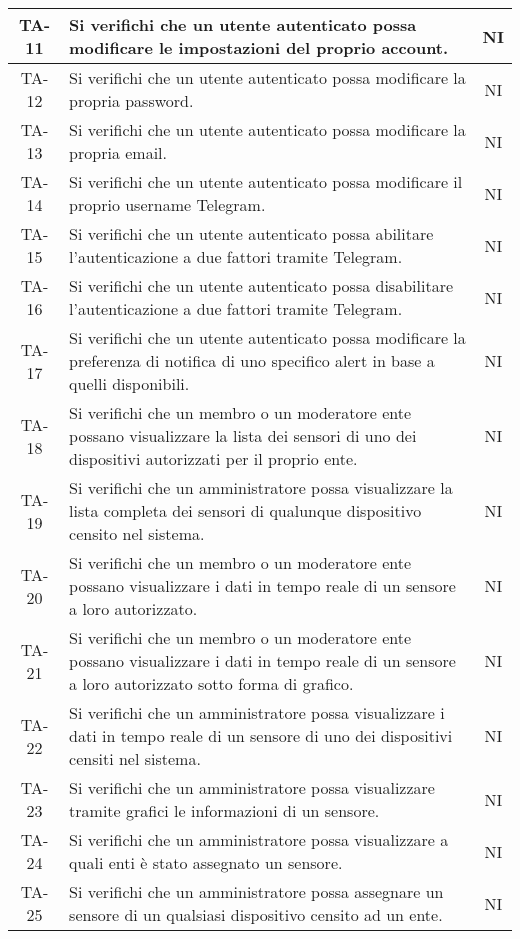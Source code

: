 \begin{center}
\begin{longtable}{|c|p{10cm}|c|}
			 \hline
			 TA-11 & Si verifichi che un utente autenticato possa modificare le impostazioni del proprio account. & NI \\
			 \hline
			 TA-12 & Si verifichi che un utente autenticato possa modificare la propria password. & NI \\
			 \hline
			 TA-13 & Si verifichi che un utente autenticato possa modificare la propria email. & NI \\
			 \hline
			 TA-14 & Si verifichi che un utente autenticato possa modificare il proprio username Telegram. & NI \\
			 \hline
			 TA-15 & Si verifichi che un utente autenticato possa abilitare l'autenticazione a due fattori tramite Telegram. & NI \\
			 \hline
			 TA-16 & Si verifichi che un utente autenticato possa disabilitare l'autenticazione a due fattori tramite Telegram. & NI \\
			 \hline
			 TA-17 & Si verifichi che un utente autenticato possa modificare la preferenza di notifica di uno specifico alert in base a quelli disponibili. & NI \\
			 \hline
			 TA-18 & Si verifichi che un membro o un moderatore ente possano visualizzare la lista dei sensori di uno dei dispositivi autorizzati per il proprio ente. & NI \\
			 \hline
			 TA-19 & Si verifichi che un amministratore possa visualizzare la lista completa dei sensori di qualunque dispositivo censito nel sistema. & NI \\
			 \hline
			 TA-20 & Si verifichi che un membro o un moderatore ente possano visualizzare i dati in tempo reale di un sensore a loro autorizzato. & NI \\
			 \hline
			 TA-21 & Si verifichi che un membro o un moderatore ente possano visualizzare i dati in tempo reale di un sensore a loro autorizzato sotto forma di grafico. & NI \\
			 \hline
			 TA-22 & Si verifichi che un amministratore possa visualizzare i dati in tempo reale di un sensore di uno dei dispositivi censiti nel sistema. & NI \\
			 \hline
			 TA-23 & Si verifichi che un amministratore possa visualizzare tramite grafici le informazioni di un sensore. & NI \\
			 \hline
			 TA-24 & Si verifichi che un amministratore possa visualizzare a quali enti è stato assegnato un sensore. & NI \\
			 \hline
			 TA-25 & Si verifichi che un amministratore possa assegnare un sensore di un qualsiasi dispositivo censito ad un ente. & NI \\

\end{longtable}
\end{center}

